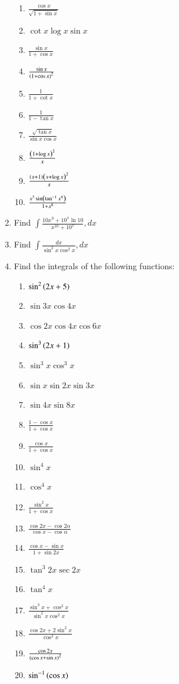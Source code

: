 \begin{enumerate}[label=\arabic*.,ref=\thesubsection.\theenumi]
\begin{enumerate}[label = (\roman*)]
\item $\frac{\cos {x}}{\sqrt{1+\sin x}}$
\item $\cot x \log x \sin x$
\item $\frac{\sin {x}}{1+\cos x}$
\item $\frac{\sin {x}}{\left(1+\cos x\right)^2}$
\item $\frac{1}{1+\cot x}$
\item $\frac{1}{1-\tan x}$
\item $\frac{\sqrt{\tan {x}}}{\sin x\cos x}$
\item $\frac{\left(1+\log x\right)^2}{x}$
\item $\frac{\left(x+1\right)\left(x +\log x\right)^2}{x}$
\item $\frac{x^3\sin\left(\tan^{-1}x^4\right)}{1+x^8}$
%
\end{enumerate}
\item Find 
$
\int \frac{10x^9+10^x\ln 10}{x^10+10^x},dx
$
\item Find 
$
\int \frac{dx}{\sin^2 x \cos^2 x},dx
$
\item Find the integrals of the following functions:
%
\begin{enumerate}[label = (\roman*)]
\item $\sin^2\left(2x+5\right)$
\item $\sin 3x \cos 4x$
\item $ \cos 2x \cos 4x \cos 6x$
\item $\sin^3\left(2x+1\right)$
\item $\sin^3 x \cos ^3 x$
\item $ \sin x \sin 2x \sin 3x$
\item $ \sin 4x \sin 8x$
\item $\frac{1-\cos x}{1+\cos x}$
\item $\frac{\cos x}{1+\cos x}$
\item $\sin^4 x$
\item $\cos ^4 x$
\item $\frac{\sin^2 x}{1+\cos x}$
\item $\frac{\cos 2x - \cos 2\alpha}{\cos x -\cos \alpha}$
\item $\frac{\cos x - \sin x}{1+\sin 2x}$
\item $\tan^3 {2x}\sec 2x$
\item $\tan^4 x$
\item $\frac{\sin^3 x +\cos^3 x}{\sin^2 x  \cos ^2 x}$
\item $\frac{\cos 2x +2\sin^2 x}{ \cos ^2 x}$
\item $\frac{\cos 2x}{\left(\cos x + \sin x\right)^2}$
\item $\sin^{-1}\left(\cos x\right)$

\end{enumerate}
\end{enumerate}
